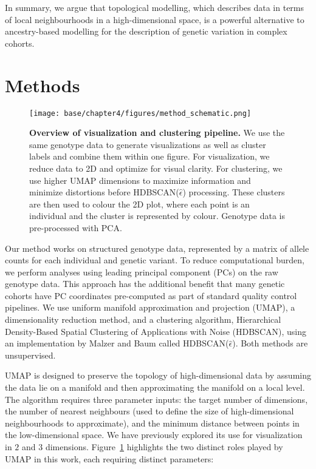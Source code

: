 In summary, we argue that topological modelling, which describes data in terms of local neighbourhoods in a high-dimensional space, is a powerful alternative to ancestry-based modelling for the description of genetic variation in complex cohorts.

\section{Methods}

\begin{figure}[h]
  \centering
  \texttt{[image: base/chapter4/figures/method\_schematic.png]}
  \caption[Overview of visualization and clustering pipeline]{\textbf{Overview of visualization and clustering pipeline.} We use the same genotype data to generate visualizations as well as cluster labels and combine them within one figure. For visualization, we reduce data to 2D and optimize for visual clarity. For clustering, we use higher UMAP dimensions to maximize information and minimize distortions before HDBSCAN($\hat{\epsilon}$) processing. These clusters are then used to colour the 2D plot, where each point is an individual and the cluster is represented by colour. Genotype data is pre-processed with PCA.}
    \label{fig:method}
\end{figure}

Our method works on structured genotype data, represented by a matrix of allele counts for each individual and genetic variant. To reduce computational burden, we perform analyses using leading principal component (PCs) on the raw genotype data. This approach has the additional benefit that many genetic cohorts have PC coordinates pre-computed as part of standard quality control pipelines. We use uniform manifold approximation and projection (UMAP)\citep{mcinnes_umap_2020}, a dimensionality reduction method, and a clustering algorithm, Hierarchical Density-Based Spatial Clustering of Applications with Noise (HDBSCAN), using an implementation by Malzer and Baum called HDBSCAN($\hat{\epsilon}$)\citep{malzer_hybrid_2020}. Both methods are unsupervised.

UMAP is designed to preserve the topology of high-dimensional data by assuming the data lie on a manifold and then approximating the manifold on a local level\citep{mcinnes_umap_2020}. The algorithm requires three parameter inputs: the target number of dimensions, the number of nearest neighbours (used to define the size of high-dimensional neighbourhoods to approximate), and the minimum distance between points in the low-dimensional space. We have previously explored its use for visualization in $2$ and $3$ dimensions\citep{diaz-papkovich_umap_2019}. Figure~\ref{fig:method} highlights the two distinct roles played by UMAP in this work, each requiring distinct parameters:  

